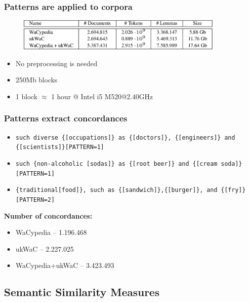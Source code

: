 \documentclass{beamer}
\begin{document}
\begin{frame}
\frametitle{Patterns are applied to corpora}

\begin{figure}	
	\centering
		\includegraphics[width=0.9\textwidth]{figures/drawing}
\end{figure}


\begin{itemize}
	  \item No preprocessing is needed
	  \item 250Mb blocks 
	  \item 1 block $\approx$ 1 hour @ Intel i5 M520@2.40GHz
	  	
\end{itemize}
\end{frame}


\begin{frame}
\frametitle{Patterns extract concordances}

\begin{itemize}
  \item \texttt{such diverse \{[occupations]\} as
  \{[doctors]\}, \{[engineers]\} and \{[scientists]\}[PATTERN=1]}
  \item \texttt{such \{non-alcoholic [sodas]\} as \{[root beer]\} and \{[cream soda]\}[PATTERN=1]}
  \item \texttt{\{traditional[food]\}, such as \{[sandwich]\},\{[burger]\}, and \{[fry]\}[PATTERN=2]}
\end{itemize}

\textbf{Number of concordances:}

\begin{itemize}
  \item WaCypedia -- 1.196.468 
  \item ukWaC -- 2.227.025 
  \item WaCypedia+ukWaC -- 3.423.493
\end{itemize}


\end{frame}

\subsection{Semantic Similarity Measures}
\end{document}
